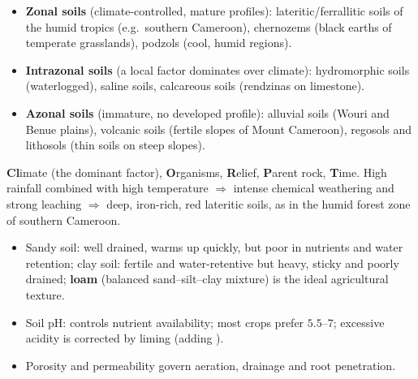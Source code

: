 \documentclass[11pt]{article}
\newcommand{\cle}[1]{{\popxbold\color{popdark}#1}}
\begin{document}
\begin{aretenir}
\begin{itemize}
\item \textbf{Zonal soils} (climate-controlled, mature profiles): lateritic/ferrallitic soils of the humid tropics (e.g.\ southern Cameroon), chernozems (black earths of temperate grasslands), podzols (cool, humid regions).
\item \textbf{Intrazonal soils} (a local factor dominates over climate): hydromorphic soils (waterlogged), saline soils, calcareous soils (rendzinas on limestone).
\item \textbf{Azonal soils} (immature, no developed profile): alluvial soils (Wouri and Benue plains), volcanic soils (fertile slopes of Mount Cameroon), regosols and lithosols (thin soils on steep slopes).
\end{itemize}
\end{aretenir}

\begin{aretenir}
\textbf{Cl}imate (the dominant factor), \textbf{O}rganisms, \textbf{R}elief, \textbf{P}arent rock, \textbf{T}ime. High rainfall combined with high temperature $\Rightarrow$ intense chemical weathering and strong leaching $\Rightarrow$ deep, iron-rich, red lateritic soils, as in the humid forest zone of southern Cameroon.
\end{aretenir}

\begin{aretenir}
\begin{itemize}
\item Sandy soil: well drained, warms up quickly, but poor in nutrients and water retention; clay soil: fertile and water-retentive but heavy, sticky and poorly drained; \textbf{loam} (balanced sand--silt--clay mixture) is the ideal agricultural texture.
\item Soil \cle{pH}: controls nutrient availability; most crops prefer $5.5$--$7$; excessive acidity is corrected by liming (adding ).
\item Porosity and permeability govern aeration, drainage and root penetration.
\end{itemize}
\end{aretenir}
\end{document}
